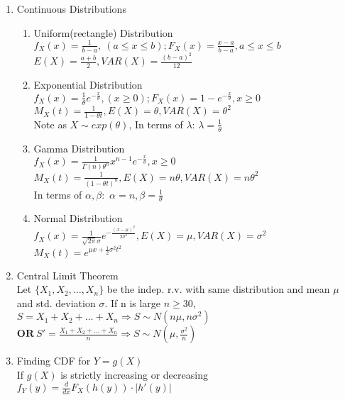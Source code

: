 \documentclass[10pt]{article}
\begin{document}
\begin{multicols}{2}
\begin{enumerate}
			\item Continuous Distributions
			\begin{enumerate}
				\item Uniform(rectangle) Distribution\\
				$f_X(x) = \frac{1}{b-a},  \  (a \le x \le b); F_X(x) = \frac{x-a}{b-a}, a\le x \le b$\\
				$E(X) = \frac{a+b}{2}, VAR(X) = \frac{(b-a)^2}{12}$
				\item Exponential Distribution\\
				$f_X(x) = \frac{1}{\theta}e^{-\frac{x}{\theta}}, (x \ge 0); F_X(x) = 1- e^{-\frac{x}{\theta}}, x \ge 0$\\
				$M_X(t) = \frac{1}{1-\theta t}, E(X) = \theta, VAR(X) = \theta^2$\\
				Note as $X \sim exp(\theta)$, In terms of $\lambda$: $\lambda = \frac{1}{\theta}$
				\item Gamma Distribution\\
				$f_X(x)= \frac{1}{\Gamma(n)\theta^n}x^{n-1}e^{-\frac{x}{\theta}}, x \ge 0$\\
				$M_X(t) = \frac{1}{(1-\theta t)^n}, E(X) = n\theta, VAR(X) = n\theta^2$\\
				In terms of $\alpha, \beta:$ $\alpha = n, \beta = \frac{1}{\theta}$
				\item Normal Distribution\\
				$f_X(x) = \frac{1}{\sqrt{2\pi}\sigma} e^{-\frac{(x-\mu)^2}{2\sigma^2}}, E(X) = \mu, VAR(X) = \sigma^2$\\
				$M_X(t) = e^{\mu x + \frac{1}{2}\sigma^2 t^2}$
			\end{enumerate}
			
			\item Central Limit Theorem\\
			Let $\{ X_1, X_2, \dots, X_n \}$ be the indep. r.v. with same distribution and mean $\mu$ and std. deviation $\sigma$. If n is large $n \ge 30$, 
			$ S = X_1 + X_2 + \dots + X_n \Rightarrow S\sim N(n\mu, n\sigma^2)$\\
			$\textbf{OR} \ S' = \frac{X_1 + X_2 + \dots + X_n}{n} \Rightarrow S\sim N(\mu, \frac{\sigma^2}{n})$
			\item Finding CDF for $Y = g(X)$\\
			If $g(X)$ is strictly increasing or decreasing\\
			$f_Y(y) = \frac{d}{dx}F_X(h(y)) \cdot |h'(y)|$
		\end{enumerate}
		\newpage
	\end{multicols}
\end{document}
